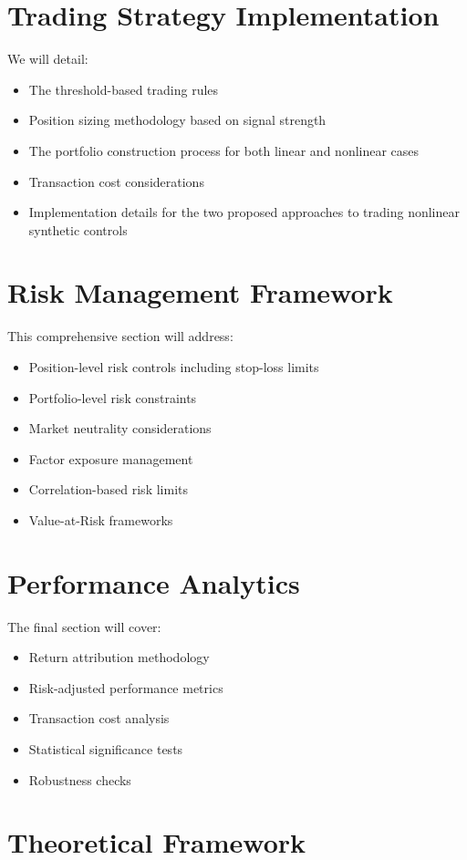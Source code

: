 \section{Trading Strategy Implementation}
We will detail:
\begin{itemize}
    \item The threshold-based trading rules
    \item Position sizing methodology based on signal strength
    \item The portfolio construction process for both linear and nonlinear cases
    \item Transaction cost considerations
    \item Implementation details for the two proposed approaches to trading nonlinear synthetic controls
\end{itemize}

\section{Risk Management Framework}
This comprehensive section will address:
\begin{itemize}
    \item Position-level risk controls including stop-loss limits
    \item Portfolio-level risk constraints
    \item Market neutrality considerations
    \item Factor exposure management
    \item Correlation-based risk limits
    \item Value-at-Risk frameworks
\end{itemize}

\section{Performance Analytics}
The final section will cover:
\begin{itemize}
    \item Return attribution methodology
    \item Risk-adjusted performance metrics
    \item Transaction cost analysis
    \item Statistical significance tests
    \item Robustness checks
\end{itemize}


\newpage
\section{Theoretical Framework}

